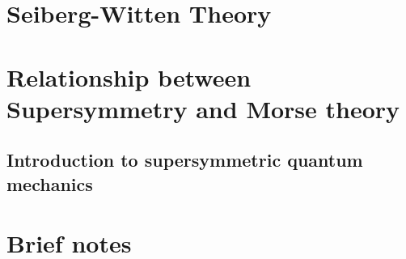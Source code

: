 \documentclass[a4paper,pdftex,10pt]{report}
\begin{document}
\clearpage
\appendix
\chapter{Seiberg-Witten Theory}




























\clearpage
\chapter{Relationship between Supersymmetry and Morse theory}



\section{Introduction to supersymmetric quantum mechanics}
























\clearpage
\chapter{Brief notes}
















\clearpage



\nocite{Peskin:1995}
\nocite{Nair:2005}
\nocite{Weinberg:1996kr}
\nocite{Weinberg:1995mt}
\nocite{Weinberg:2000}

\nocite{Witten:1982df}
\nocite{Witten:1982im}

\nocite{Seiberg:1994aj}
\nocite{Seiberg:1994rs}
\nocite{Alvarez-Gaume:1996ohl}
\nocite{Tachikawa:2013kta}

\end{document}
